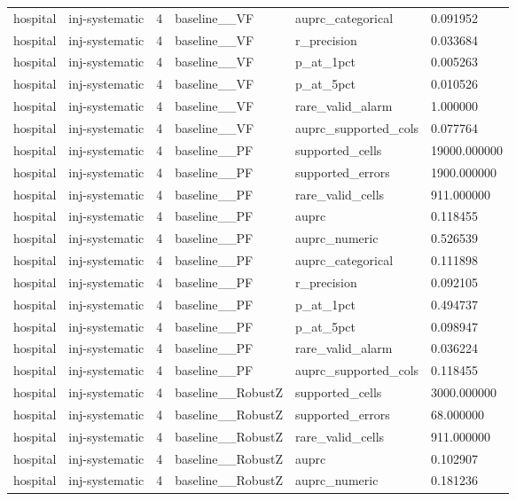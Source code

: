 \begin{tabular}{llllll}
hospital & inj-systematic & 4 & baseline\_\_VF & auprc\_categorical & 0.091952 \\
hospital & inj-systematic & 4 & baseline\_\_VF & r\_precision & 0.033684 \\
hospital & inj-systematic & 4 & baseline\_\_VF & p\_at\_1pct & 0.005263 \\
hospital & inj-systematic & 4 & baseline\_\_VF & p\_at\_5pct & 0.010526 \\
hospital & inj-systematic & 4 & baseline\_\_VF & rare\_valid\_alarm & 1.000000 \\
hospital & inj-systematic & 4 & baseline\_\_VF & auprc\_supported\_cols & 0.077764 \\
hospital & inj-systematic & 4 & baseline\_\_PF & supported\_cells & 19000.000000 \\
hospital & inj-systematic & 4 & baseline\_\_PF & supported\_errors & 1900.000000 \\
hospital & inj-systematic & 4 & baseline\_\_PF & rare\_valid\_cells & 911.000000 \\
hospital & inj-systematic & 4 & baseline\_\_PF & auprc & 0.118455 \\
hospital & inj-systematic & 4 & baseline\_\_PF & auprc\_numeric & 0.526539 \\
hospital & inj-systematic & 4 & baseline\_\_PF & auprc\_categorical & 0.111898 \\
hospital & inj-systematic & 4 & baseline\_\_PF & r\_precision & 0.092105 \\
hospital & inj-systematic & 4 & baseline\_\_PF & p\_at\_1pct & 0.494737 \\
hospital & inj-systematic & 4 & baseline\_\_PF & p\_at\_5pct & 0.098947 \\
hospital & inj-systematic & 4 & baseline\_\_PF & rare\_valid\_alarm & 0.036224 \\
hospital & inj-systematic & 4 & baseline\_\_PF & auprc\_supported\_cols & 0.118455 \\
hospital & inj-systematic & 4 & baseline\_\_RobustZ & supported\_cells & 3000.000000 \\
hospital & inj-systematic & 4 & baseline\_\_RobustZ & supported\_errors & 68.000000 \\
hospital & inj-systematic & 4 & baseline\_\_RobustZ & rare\_valid\_cells & 911.000000 \\
hospital & inj-systematic & 4 & baseline\_\_RobustZ & auprc & 0.102907 \\
hospital & inj-systematic & 4 & baseline\_\_RobustZ & auprc\_numeric & 0.181236 \\

\end{tabular}
